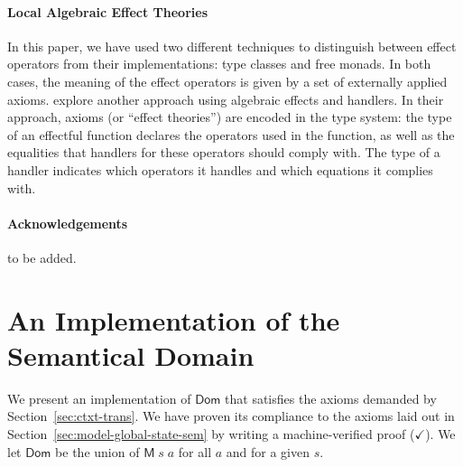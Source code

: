 \documentclass{llncs}
\newcommand{\Conid}[1]{\mathit{#1}}
\newcommand{\Varid}[1]{\mathit{#1}}
\let\Varid\mathit
\let\Conid\mathsf
\begin{document}
\paragraph{Local Algebraic Effect Theories}
In this paper, we have used two different techniques to distinguish between
effect operators from their implementations: type classes and free monads. In
both cases, the meaning of the effect operators is given by a set of externally
applied axioms.
\cite{Pretnar:19} explore another approach using algebraic
effects and handlers.
In their approach, axioms (or ``effect theories'') are encoded in the type
system: the type of an effectful function declares the operators used in the
function, as well as the equalities that handlers for these operators
should comply with.
The type of a handler indicates which operators it handles and which equations
it complies with.



\paragraph{Acknowledgements} to be added.


%

%

\appendix

\pagebreak
\section{An Implementation of the Semantical Domain}
\label{sec:GSMonad}

We present an implementation of \ensuremath{\Conid{Dom}} that satisfies the
axioms demanded by Section~\ref{sec:ctxt-trans}.
We have proven its compliance to the axioms laid out in
Section~\ref{sec:model-global-state-sem} by writing a machine-verified proof
($\checkmark$).
We let \ensuremath{\Conid{Dom}} be the union of \ensuremath{\Conid{M}\;\Varid{s}\;\Varid{a}} for all \ensuremath{\Varid{a}} and
for a given \ensuremath{\Varid{s}}.
\end{document}
